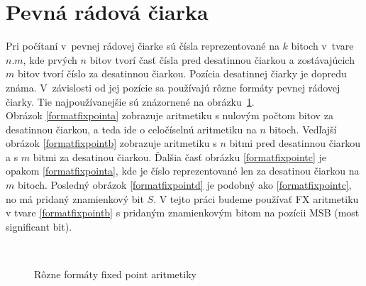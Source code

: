 \section{Pevná rádová čiarka}
Pri počítaní v~pevnej rádovej čiarke sú čísla reprezentované na $ k $ bitoch v~tvare $ n.m $, kde prvých $ n $ bitov tvorí časť čísla pred desatinnou čiarkou a zostávajúcich $ m $ bitov tvorí číslo za desatinnou čiarkou. Pozícia desatinnej čiarky je dopredu známa. V~závislosti od jej pozície sa používajú rôzne formáty pevnej rádovej čiarky. Tie najpoužívanejšie sú znázornené na obrázku~\ref{formatfixpoint}. \\
Obrázok \ref{formatfixpointa} zobrazuje aritmetiku s nulovým počtom bitov za desatinnou čiarkou, a teda ide o celočíselnú aritmetiku na $ n $ bitoch. Vedľajší obrázok \ref{formatfixpointb} zobrazuje aritmetiku s $ n $ bitmi pred desatinnou čiarkou a s $ m $ bitmi za desatinou čiarkou. Ďalšia časť obrázku \ref{formatfixpointc} je opakom \ref{formatfixpointa}, kde je číslo reprezentované len za desatinou čiarkou na $ m $ bitoch. Posledný obrázok \ref{formatfixpointd} je podobný ako \ref{formatfixpointc}, no má pridaný znamienkový bit $ S $.
V tejto práci budeme používať FX aritmetiku v tvare \ref{formatfixpointb} s pridaným znamienkovým bitom na pozícii MSB (most significant bit).


\begin{figure}[h]
\centering
{} \hspace{0.6cm}
 \\ \bigskip
{} \hspace{1.2cm}
\caption{Rôzne formáty fixed point aritmetiky \cite{KrausDisP}}
\label{formatfixpoint}
\end{figure}
\bigskip

